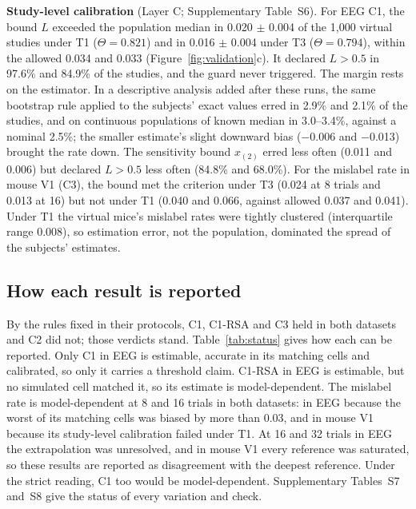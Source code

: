 \documentclass[11pt]{article}
\newcommand{\LcEegTone}{0.020}
\newcommand{\LcEegToneSe}{0.004}
\newcommand{\LcEegToneAllowed}{0.034}
\newcommand{\LcEegToneTheta}{0.821}
\newcommand{\LcEegToneDeclares}{97.6}
\newcommand{\LcEegToneXtwo}{0.011}
\newcommand{\LcEegToneXtwoDeclares}{84.8}
\newcommand{\LcEegToneExact}{2.9}
\newcommand{\LcEegToneBias}{$-$0.006}
\newcommand{\LcMouseToneREight}{0.040}
\newcommand{\LcMouseToneREightAllowed}{0.037}
\newcommand{\LcMouseToneRSixteen}{0.066}
\newcommand{\LcMouseToneRSixteenAllowed}{0.041}
\newcommand{\LcEegTthree}{0.016}
\newcommand{\LcEegTthreeSe}{0.004}
\newcommand{\LcEegTthreeAllowed}{0.033}
\newcommand{\LcEegTthreeTheta}{0.794}
\newcommand{\LcEegTthreeDeclares}{84.9}
\newcommand{\LcEegTthreeXtwo}{0.006}
\newcommand{\LcEegTthreeXtwoDeclares}{68.0}
\newcommand{\LcEegTthreeExact}{2.1}
\newcommand{\LcEegTthreeBias}{$-$0.013}
\newcommand{\LcMouseTthreeREight}{0.024}
\newcommand{\LcMouseTthreeRSixteen}{0.013}
\newcommand{\LcRuleLo}{3.0}
\newcommand{\LcRuleHi}{3.4}
\newcommand{\LcMouseIqr}{0.008}
\begin{document}
\textbf{Study-level calibration} (Layer C; Supplementary Table~S6).
For EEG C1, the bound $L$ exceeded the population median in \LcEegTone{} $\pm$ \LcEegToneSe{} of the 1{,}000 virtual studies under T1 ($\Theta=\LcEegToneTheta$) and in \LcEegTthree{} $\pm$ \LcEegTthreeSe{} under T3 ($\Theta=\LcEegTthreeTheta$), within the allowed \LcEegToneAllowed{} and \LcEegTthreeAllowed{} (Figure~\ref{fig:validation}c).
It declared $L>0.5$ in \LcEegToneDeclares\% and \LcEegTthreeDeclares\% of the studies, and the guard never triggered.
The margin rests on the estimator.
In a descriptive analysis added after these runs, the same bootstrap rule applied to the subjects' exact values erred in \LcEegToneExact\% and \LcEegTthreeExact\% of the studies, and on continuous populations of known median in \LcRuleLo--\LcRuleHi\%, against a nominal 2.5\%; the smaller estimate's slight downward bias (\LcEegToneBias{} and \LcEegTthreeBias) brought the rate down.
The sensitivity bound $x_{(2)}$ erred less often (\LcEegToneXtwo{} and \LcEegTthreeXtwo) but declared $L>0.5$ less often (\LcEegToneXtwoDeclares\% and \LcEegTthreeXtwoDeclares\%).
For the mislabel rate in mouse V1 (C3), the bound met the criterion under T3 (\LcMouseTthreeREight{} at 8 trials and \LcMouseTthreeRSixteen{} at 16) but not under T1 (\LcMouseToneREight{} and \LcMouseToneRSixteen, against allowed \LcMouseToneREightAllowed{} and \LcMouseToneRSixteenAllowed).
Under T1 the virtual mice's mislabel rates were tightly clustered (interquartile range \LcMouseIqr), so estimation error, not the population, dominated the spread of the subjects' estimates.

\subsection{How each result is reported}\label{sec:res-status}

By the rules fixed in their protocols, C1, C1-RSA and C3 held in both datasets and C2 did not; those verdicts stand.
Table~\ref{tab:status} gives how each can be reported.
Only C1 in EEG is estimable, accurate in its matching cells and calibrated, so only it carries a threshold claim.
C1-RSA in EEG is estimable, but no simulated cell matched it, so its estimate is model-dependent.
The mislabel rate is model-dependent at 8 and 16 trials in both datasets: in EEG because the worst of its matching cells was biased by more than 0.03, and in mouse V1 because its study-level calibration failed under T1.
At 16 and 32 trials in EEG the extrapolation was unresolved, and in mouse V1 every reference was saturated, so these results are reported as disagreement with the deepest reference.
Under the strict reading, C1 too would be model-dependent.
Supplementary Tables~S7 and~S8 give the status of every variation and check.
\end{document}
